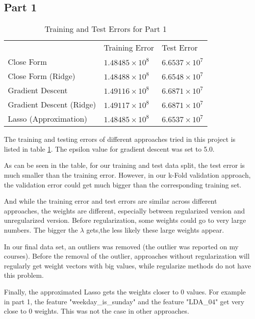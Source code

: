 \documentclass[conference,compsoc]{IEEEtran}
\begin{document}
\subsection{Part 1}

\begin{table}[]
	\centering
	\caption{Training and Test Errors for Part 1}\label{table:part1results}
	\begin{tabular}{lll}
		& Training Error                            & Test Error           \\
		Close Form                & $1.48485 \times 10^8$ & $6.6537 \times 10^7$ \\
		Close Form (Ridge)        & $1.48488 \times 10^8$ & $6.6548 \times 10^7$ \\
		Gradient Descent          & $1.49116 \times 10^8$ & $6.6871 \times 10^7$ \\
		Gradient Descent (Ridge)  & $1.49117 \times 10^8$ & $6.6871 \times 10^7$ \\
		Lasso (Approximation)  & $1.48485 \times 10^8$ & $6.6537 \times 10^7$  \\       
	\end{tabular}
\end{table}

The training and testing errors of different approaches tried in this project is listed in table \ref{table:part1results}. The epsilon value for gradient descent was set to 5.0.

As can be seen in the table, for our training and test data split, the test error is much smaller than the training error. However, in our k-Fold validation approach, the validation error could get much bigger than the corresponding training set.

And while the training error and test errors are similar across different approaches, the weights are different, especially between regularized version and unregularized version. Before regularization, some weights could go to very large numbers. The bigger the $\lambda$ gets,the less likely these large weights appear.

In our final data set, an outliers was removed (the outlier was reported on my courses). Before the removal of the outlier, approaches without regularization will regularly get weight vectors with big values, while regularize methods do not have this problem.

Finally, the approximated Lasso gets the weights closer to $0$ values. For example in part 1, the feature "weekday\_is\_sunday" and the feature "LDA\_04" get very close to $0$ weights. This was not the case in other approaches.
\end{document}
